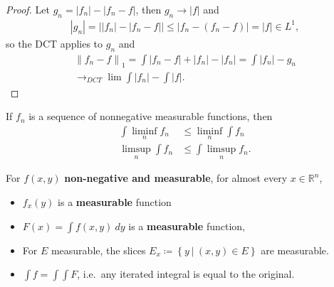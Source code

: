 \begin{proof}

Let
\(g_n = {\left\lvert {f_n} \right\rvert} - {\left\lvert {f_n - f} \right\rvert}\),
then \(g_n \to {\left\lvert {f} \right\rvert}\) and
\begin{align*}
{\left\lvert {g_n} \right\rvert} = {\left\lvert { {\left\lvert {f_n} \right\rvert} - {\left\lvert {f_n - f} \right\rvert} } \right\rvert} \leq {\left\lvert {f_n - (f_n - f)} \right\rvert} = {\left\lvert {f} \right\rvert} \in L^1
,\end{align*}
so the DCT applies to \(g_n\) and
\begin{align*}
{\left\lVert {f_n - f} \right\rVert}_1 = \int {\left\lvert {f_n - f} \right\rvert} + {\left\lvert {f_n} \right\rvert} - {\left\lvert {f_n} \right\rvert}
= \int {\left\lvert {f_n} \right\rvert} - g_n\\
\to_{DCT} \lim \int {\left\lvert {f_n} \right\rvert} - \int {\left\lvert {f} \right\rvert}
.\end{align*}

\end{proof}

\begin{theorem}[Fatou]

If \(f_n\) is a sequence of nonnegative measurable functions, then
\begin{align*}
\int \liminf_n f_n &\leq \liminf_n \int f_n \\
\limsup_n \int f_n &\leq \int \limsup_n f_n
.\end{align*}

\end{theorem}

\begin{theorem}

For \(f(x, y)\) \textbf{non-negative and measurable}, for almost every
\(x\in {\mathbb{R}}^n\),

\begin{itemize}
\tightlist
\item
  \(f_x(y)\) is a \textbf{measurable} function
\item
  \(F(x) = \int f(x, y) ~dy\) is a \textbf{measurable} function,
\item
  For \(E\) measurable, the slices
  \(E_x \coloneqq\left\{{y {~\mathrel{\Big|}~}(x, y) \in E}\right\}\)
  are measurable.
\item
  \(\int f = \int \int F\), i.e.~any iterated integral is equal to the
  original.
\end{itemize}

\end{theorem}

